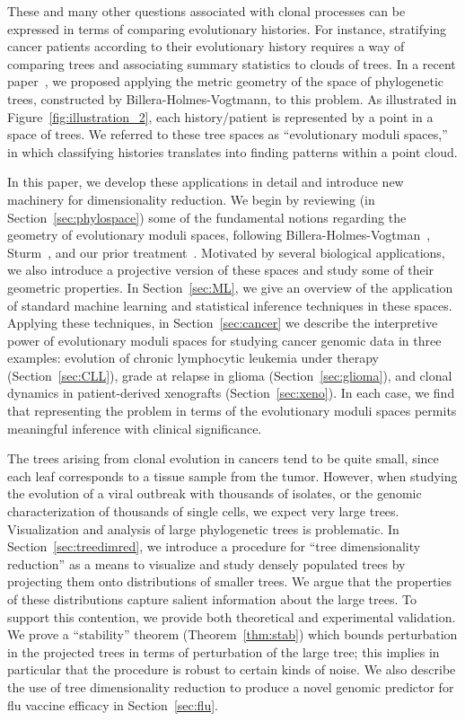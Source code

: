 \documentclass[a4paper,11pt]{article}
\begin{document}
These and many other questions associated with clonal processes can be expressed in terms of comparing evolutionary histories.
For instance, stratifying cancer patients according to their evolutionary history requires a way of comparing trees and associating summary statistics to clouds of trees.
In a recent paper~\cite{zairis2014moduli}, we proposed applying the metric geometry of the space of phylogenetic trees, constructed by Billera-Holmes-Vogtmann, to this problem.
As illustrated in Figure~\ref{fig:illustration_2}, each history/patient is represented by a point in a space of trees.
We referred to these tree spaces as ``evolutionary moduli spaces,'' in which classifying histories translates into finding patterns within a point cloud.

In this paper, we develop these applications in detail and introduce new machinery for dimensionality reduction.
We begin by reviewing (in Section~\ref{sec:phylospace}) some of the fundamental notions regarding the geometry of evolutionary moduli spaces, following Billera-Holmes-Vogtman~\cite{billera2001geometry}, Sturm~\cite{sturm2003probability}, and our prior treatment~\cite{zairis2014moduli}.
Motivated by several biological applications, we also introduce a projective version of these spaces and study some of their geometric properties.
In Section~\ref{sec:ML}, we give an overview of the application of standard machine learning and statistical inference techniques in these spaces. Applying these techniques, in Section~\ref{sec:cancer} we describe the interpretive power of evolutionary moduli spaces for studying cancer genomic data in three examples: evolution of chronic lymphocytic leukemia under therapy (Section~\ref{sec:CLL}), grade at relapse in glioma (Section~\ref{sec:glioma}), and clonal dynamics in patient-derived xenografts (Section~\ref{sec:xeno}).
In each case, we find that representing the problem in terms of the evolutionary moduli spaces permits meaningful inference with clinical significance.

The trees arising from clonal evolution in cancers tend to be quite small, since each leaf corresponds to a tissue sample from the tumor.
However, when studying the evolution of a viral outbreak with thousands of isolates, or the genomic characterization of thousands of single cells, we expect very large trees.
Visualization and analysis of large phylogenetic trees is problematic.
In Section~\ref{sec:treedimred}, we introduce a procedure for ``tree dimensionality reduction'' as a means to visualize and study densely populated trees by projecting them onto distributions of smaller trees.
We argue that the properties of these distributions capture salient information about the large trees.
To support this contention, we provide both theoretical and experimental validation.
We prove a ``stability'' theorem (Theorem~\ref{thm:stab}) which bounds perturbation in the projected trees in terms of perturbation of the large tree; this implies in particular that the procedure is robust to certain kinds of noise.
We also describe the use of tree dimensionality reduction to produce a novel genomic predictor for flu vaccine efficacy in Section~\ref{sec:flu}.
\end{document}

